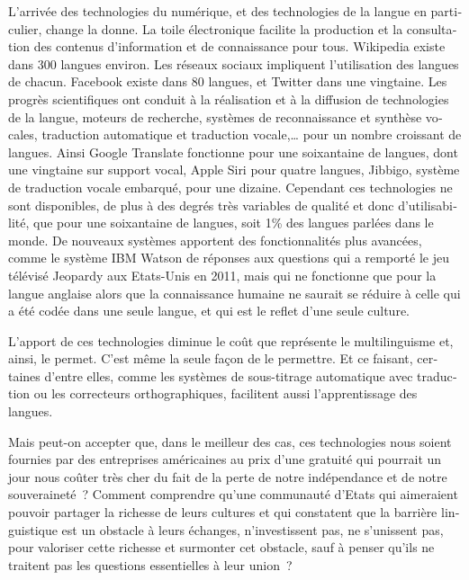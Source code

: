\begin{french}
\begin{multicols}{2}
L’arrivée des technologies du numérique, et des technologies de la langue en particulier, change la donne. La toile électronique facilite la production et la consultation des contenus d’information et de connaissance pour tous. Wikipedia existe dans 300 langues environ. Les réseaux sociaux impliquent l’utilisation des langues de chacun. Facebook existe dans 80 langues, et Twitter dans une vingtaine. Les progrès scientifiques ont conduit à la réalisation et à la diffusion de technologies de la langue, moteurs de recherche, systèmes de reconnaissance et synthèse vocales, traduction automatique et traduction vocale,… pour un nombre croissant de langues. Ainsi Google Translate fonctionne pour une soixantaine de langues, dont une vingtaine sur support vocal, Apple Siri pour quatre langues, Jibbigo, système de traduction vocale embarqué, pour une dizaine. Cependant ces technologies ne sont disponibles, de plus à des degrés très variables de qualité et donc d’utilisabilité, que pour une soixantaine de langues, soit 1\% des langues parlées dans le monde. De nouveaux systèmes apportent des fonctionnalités plus avancées, comme le système IBM Watson de réponses aux questions qui a remporté le jeu télévisé Jeopardy aux Etats-Unis en 2011, mais qui ne fonctionne que pour la langue anglaise alors que la connaissance humaine ne saurait se réduire à celle qui a été codée dans une seule langue, et qui est le reflet d’une seule culture.

L’apport de ces technologies diminue le coût que représente le multilinguisme et, ainsi, le permet. C’est même la seule façon de le permettre. Et ce faisant, certaines d’entre elles, comme les systèmes de sous-titrage automatique avec traduction ou les correcteurs orthographiques, facilitent aussi l’apprentissage des langues.

Mais peut-on accepter que, dans le meilleur des cas, ces technologies nous soient fournies par des entreprises américaines au prix d’une gratuité qui pourrait un jour nous coûter très cher du fait de la perte de notre indépendance et de notre souveraineté~? Comment comprendre qu’une communauté d’Etats qui aimeraient pouvoir partager la richesse de leurs cultures et qui constatent que la barrière linguistique est un obstacle à leurs échanges, n’investissent pas, ne s’unissent pas, pour valoriser cette richesse et surmonter cet obstacle, sauf à penser qu’ils ne traitent pas les questions essentielles à leur union~?


\end{multicols}
\end{french}

